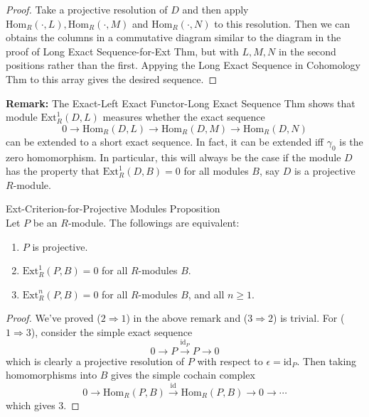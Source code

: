 \begin{proof}
    Take a projective resolution of $D$ and then apply $\text{Hom}_R(\cdot, L),\text{Hom}_R(\cdot, M)$ and $\text{Hom}_R(\cdot, N)$ to this resolution. Then we can obtains the columns in a commutative diagram similar to the diagram in the proof of Long Exact Sequence-for-Ext Thm, but with $L,M,N$ in the second positions rather than the first. Appying the Long Exact Sequence in Cohomology Thm to this array gives the desired sequence.
\end{proof}


\noindent\textbf{Remark:} The Exact-Left Exact Functor-Long Exact Sequence Thm shows that module $\text{Ext}_R^1 (D,L)$ measures whether the exact sequence
\[
0\to \text{Hom}_R(D,L) \to \text{Hom}_R(D,M) \to \text{Hom}_R(D,N)
\]
can be extended to a short exact sequence. In fact, it can be extended iff $\gamma_0$ is the zero homomorphism. In particular, this will always be the case if the module $D$ has the property that $\text{Ext}_R^1 (D,B)=0$ for all modules $B$, say $D$ is a projective $R$-module.

\begin{proposition}{Ext-Criterion-for-Projective Modules Proposition}\\
Let $P$ be an $R$-module. The followings are equivalent:
\begin{enumerate}
    \item $P$ is projective.
    \item $\text{Ext}_R^1 (P,B)=0$ for all $R$-modules $B$.
    \item $\text{Ext}_R^n (P,B)=0$ for all $R$-modules $B$, and all $n\geq 1$.
\end{enumerate}
\end{proposition}


\begin{proof}
    We've proved ($2\Rightarrow1$) in the above remark and ($3\Rightarrow2$) is trivial. For ($1\Rightarrow3$), consider the simple exact sequence
    \[
    0\to P\xrightarrow{\text{id}_P} P\to 0
    \]
    which is clearly a projective resolution of $P$ with respect to $\epsilon= \text{id}_P$. Then taking homomorphisms into $B$ gives the simple cochain complex
    \[
    0\to \text{Hom}_R (P,B) \xrightarrow{\text{id}} \text{Hom}_R(P,B) \to 0\to \cdots
    \]
    which gives 3.
\end{proof}

